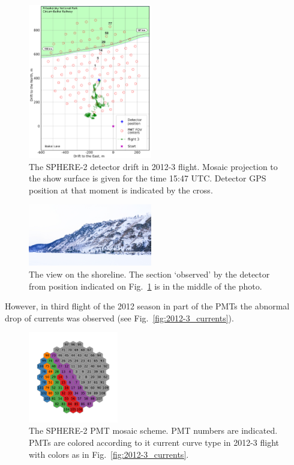 \documentclass[final,5p,times,twocolumn]{elsarticle}
\begin{document}
\begin{figure}[tb]
    \includegraphics[width=0.48\textwidth]{2012_drift-mod.pdf}
    \caption{The SPHERE-2 detector drift in 2012-3 flight. Mosaic projection to the show surface is given for the time 15:47 UTC. Detector GPS position at that moment is indicated by the cross.}
    \label{fig:2012-drift}
\end{figure}

\begin{figure}[tb]
    \includegraphics[width=0.48\textwidth]{DSC_7256_1.jpg}
    \caption{The view on the shoreline. The section `observed' by the detector from position indicated on Fig.~\ref{fig:2012-drift} is in the middle of the photo.}
    \label{fig:2012--shore-view}
\end{figure}


However, in third flight of the 2012 season in part of the PMTs the abnormal drop of currents was observed (see Fig.~\ref{fig:2012-3_currents}).

\begin{figure}[tb]
\centering
    \includegraphics[width=0.35\textwidth]{2012-3_retina_all.pdf}
    \caption{The SPHERE-2 PMT mosaic scheme. PMT numbers are indicated. PMTs are colored according to it current curve type in 2012-3 flight with colors as in Fig.~\ref{fig:2012-3_currents}.}
    \label{fig:2012-3_shore_image}
\end{figure}
\end{document}
